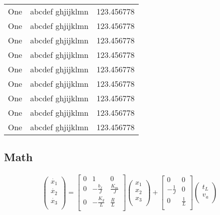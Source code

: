 \begin{longtable}{|l|l|l|}
One & abcdef ghjijklmn & 123.456778 \\
One & abcdef ghjijklmn & 123.456778 \\
One & abcdef ghjijklmn & 123.456778 \\
One & abcdef ghjijklmn & 123.456778 \\
One & abcdef ghjijklmn & 123.456778 \\
One & abcdef ghjijklmn & 123.456778 \\
One & abcdef ghjijklmn & 123.456778 \\
One & abcdef ghjijklmn & 123.456778 \\
One & abcdef ghjijklmn & 123.456778 \\
\end{longtable}
 

\subsection{Math}
\begin{align}
\left(\begin{array}{r}
\dot{x_{1}} \\                                              
\dot{x_{2}} \\ 
\dot{x_{3}} \\                                 
\end{array}\right) =
\left[\begin{array}{rrr}
0 & 1 & 0 \\                                              
0 & -\frac{b_{f}}{J} & \frac{K_{m}}{J} \\
0 & -\frac{K_{g}}{L} & \frac{R}{L} \\                                      
\end{array}\right]
\left(\begin{array}{r}
x_{1} \\                                              
x_{2} \\ 
x_{3} \\                                 
\end{array}\right) +
\left[\begin{array}{rr}
0 & 0 \\                                              
-\frac{1}{J} & 0 \\ 
0 & \frac{1}{L} \\                                 
\end{array}\right]
\left(\begin{array}{r}
t_{L} \\                                              
v_{a} \\                                 
\end{array}\right)
\end{align}

